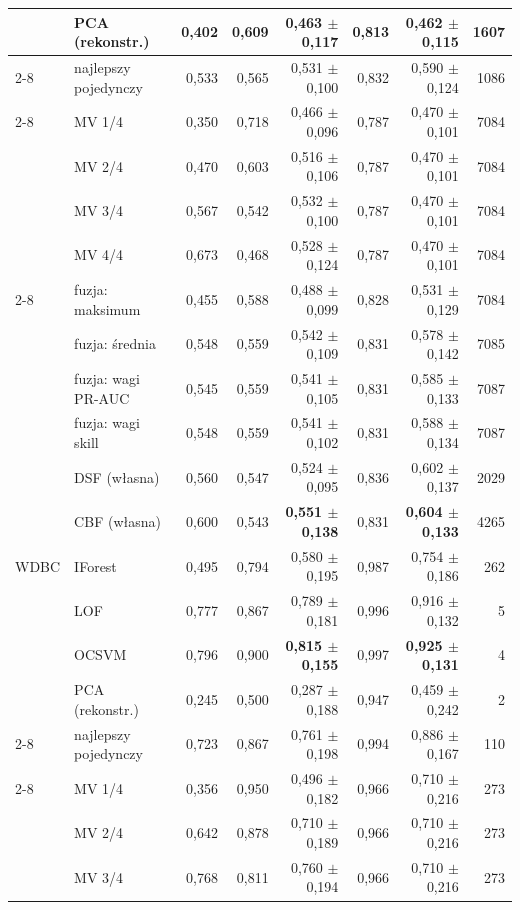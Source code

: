 \begin{longtable}{llrrrrrr}
 & PCA (rekonstr.) & 0,402 & 0,609 & 0,463 $\pm$ 0,117 & 0,813 & 0,462 $\pm$ 0,115 & 1607 \\
\cmidrule(l){2-8}
 & najlepszy pojedynczy & 0,533 & 0,565 & 0,531 $\pm$ 0,100 & 0,832 & 0,590 $\pm$ 0,124 & 1086 \\
\cmidrule(l){2-8}
 & MV 1/4 & 0,350 & 0,718 & 0,466 $\pm$ 0,096 & 0,787 & 0,470 $\pm$ 0,101 & 7084 \\
 & MV 2/4 & 0,470 & 0,603 & 0,516 $\pm$ 0,106 & 0,787 & 0,470 $\pm$ 0,101 & 7084 \\
 & MV 3/4 & 0,567 & 0,542 & 0,532 $\pm$ 0,100 & 0,787 & 0,470 $\pm$ 0,101 & 7084 \\
 & MV 4/4 & 0,673 & 0,468 & 0,528 $\pm$ 0,124 & 0,787 & 0,470 $\pm$ 0,101 & 7084 \\
\cmidrule(l){2-8}
 & fuzja: maksimum & 0,455 & 0,588 & 0,488 $\pm$ 0,099 & 0,828 & 0,531 $\pm$ 0,129 & 7084 \\
 & fuzja: średnia & 0,548 & 0,559 & 0,542 $\pm$ 0,109 & 0,831 & 0,578 $\pm$ 0,142 & 7085 \\
 & fuzja: wagi PR-AUC & 0,545 & 0,559 & 0,541 $\pm$ 0,105 & 0,831 & 0,585 $\pm$ 0,133 & 7087 \\
 & fuzja: wagi skill & 0,548 & 0,559 & 0,541 $\pm$ 0,102 & 0,831 & 0,588 $\pm$ 0,134 & 7087 \\
 & DSF (własna) & 0,560 & 0,547 & 0,524 $\pm$ 0,095 & 0,836 & 0,602 $\pm$ 0,137 & 2029 \\
 & CBF (własna) & 0,600 & 0,543 & \textbf{0,551 $\pm$ 0,138} & 0,831 & \textbf{0,604 $\pm$ 0,133} & 4265 \\
\midrule
WDBC & IForest & 0,495 & 0,794 & 0,580 $\pm$ 0,195 & 0,987 & 0,754 $\pm$ 0,186 & 262 \\
 & LOF & 0,777 & 0,867 & 0,789 $\pm$ 0,181 & 0,996 & 0,916 $\pm$ 0,132 & 5 \\
 & OCSVM & 0,796 & 0,900 & \textbf{0,815 $\pm$ 0,155} & 0,997 & \textbf{0,925 $\pm$ 0,131} & 4 \\
 & PCA (rekonstr.) & 0,245 & 0,500 & 0,287 $\pm$ 0,188 & 0,947 & 0,459 $\pm$ 0,242 & 2 \\
\cmidrule(l){2-8}
 & najlepszy pojedynczy & 0,723 & 0,867 & 0,761 $\pm$ 0,198 & 0,994 & 0,886 $\pm$ 0,167 & 110 \\
\cmidrule(l){2-8}
 & MV 1/4 & 0,356 & 0,950 & 0,496 $\pm$ 0,182 & 0,966 & 0,710 $\pm$ 0,216 & 273 \\
 & MV 2/4 & 0,642 & 0,878 & 0,710 $\pm$ 0,189 & 0,966 & 0,710 $\pm$ 0,216 & 273 \\
 & MV 3/4 & 0,768 & 0,811 & 0,760 $\pm$ 0,194 & 0,966 & 0,710 $\pm$ 0,216 & 273 \\

\end{longtable}
